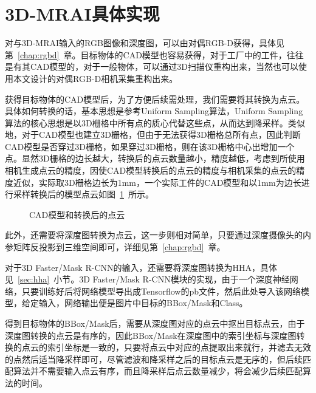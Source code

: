 \section{3D-MRAI具体实现}
对与3D-MRAI输入的RGB图像和深度图，可以由对偶RGB-D获得，具体见第~\ref{chap:rgbd}~章。目标物体的CAD模型也容易获得，对于工厂中的工件，往往是有其CAD模型的，对于一般物体，可以通过3D扫描仪重构出来，当然也可以使用本文设计的对偶RGB-D相机采集重构出来。

获得目标物体的CAD模型后，为了方便后续需处理，我们需要将其转换为点云。具体如何转换的话，基本思想是参考Uniform Sampling算法，Uniform Sampling算法的核心思想是以3D栅格中所有点的质心代替这些点，从而达到降采样。类似地，对于CAD模型也建立3D栅格，但由于无法获得3D栅格总所有点，因此判断CAD模型是否穿过3D栅格，如果穿过3D栅格，则在该3D栅格中心出增加一个点。显然3D栅格的边长越大，转换后的点云数量越小，精度越低，考虑到所使用相机生成点云的精度，因使CAD模型转换后的点云的精度与相机采集的点云的精度近似，实际取3D栅格边长为1mm，一个实际工件的CAD模型和以1mm为边长进行采样转换后的模型点云如图~\ref{fig:model-pc}~所示。
\begin{figure}[ht]
  \centering
  \hskip1cm
  \label{fig:model-pc}
  \caption{CAD模型和转换后的点云}
\end{figure}
此外，还需要将深度图转换为点云，这一步则相对简单，只要通过深度摄像头的内参矩阵反投影到三维空间即可，详细见第~\ref{chap:rgbd}~章。

对于3D Faster/Mask R-CNN的输入，还需要将深度图转换为HHA，具体见~\ref{sec:hha}~小节。3D Faster/Mask R-CNN模块的实现，由于一个深度神经网络，只要训练好后将网络模型导出成Tensorflow的pb文件，然后此处导入该网络模型，给定输入，网络输出便是图片中目标的BBox/Mask和Class。

得到目标物体的BBox/Mask后，需要从深度图对应的点云中抠出目标点云，由于深度图转换的点云是有序的，因此BBox/Mask在深度图中的索引坐标与深度图转换的点云的索引坐标是一致的，只要将点云中对应的点提取出来就行，并滤去无效的点然后适当降采样即可，尽管滤波和降采样之后的目标点云是无序的，但后续匹配算法并不需要输入点云有序，而且降采样后点云数量减少，将会减少后续匹配算法的时间。

